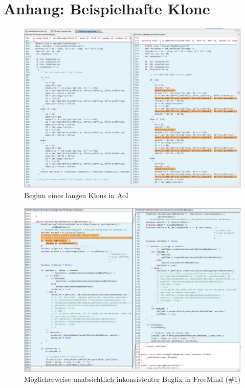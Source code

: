 \section{Anhang: Beispielhafte Klone}

\begin{figure}[h!]
  \centering
  \includegraphics[width=\textwidth]{imgs/clone_examples/gapped_clip_triangle.PNG}
  \caption{Beginn eines langen Klons in AoI}
\end{figure}


\begin{figure}[h!]
  \centering
  \includegraphics[width=\textwidth]{imgs/clone_examples/freemind_fix.PNG}
  \caption{Möglicherweise unabsichtlich inkonsistenter Bugfix in FreeMind (\#1)}
\end{figure}


